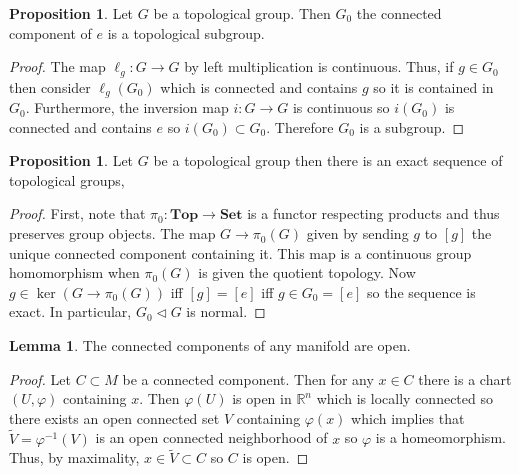 \documentclass[12pt]{extarticle}
\newcommand{\R}{\mathbb{R}}
\theoremstyle{definition}
\newtheorem{lemma}[theorem]{Lemma}
\newtheorem{proposition}[theorem]{Proposition}
\begin{document}
\begin{proposition}
Let $G$ be a topological group. Then $G_0$ the connected component of $e$ is a topological subgroup. 
\end{proposition}

\begin{proof}
The map $\ell_g : G \to G$ by left multiplication is continuous. Thus, if $g \in G_0$ then consider $\ell_{g}(G_0)$ which is connected and contains $g$ so it is contained in $G_0$. Furthermore, the inversion map $i : G \to G$ is continuous so $i(G_0)$ is connected and contains $e$ so $i(G_0) \subset G_0$. Therefore $G_0$ is a subgroup. 
\end{proof}

\begin{proposition}
Let $G$ be a topological group then there is an exact sequence of topological groups,
\begin{center}
\end{center}
\end{proposition}

\begin{proof}
First, note that $\pi_0 : \mathbf{Top} \to \mathbf{Set}$ is a functor respecting products and thus preserves group objects. The map $G \to \pi_0(G)$ given by sending $g$ to $[g]$ the unique connected component containing it. This map is a continuous group homomorphism when $\pi_0(G)$ is given the quotient topology. 
Now $g \in \ker{(G \to \pi_0(G))}$ iff $[g] = [e]$ iff $g \in G_0 = [e]$ so the sequence is exact. In particular, $G_0 \triangleleft G$ is normal.
\end{proof}

\begin{lemma}
The connected components of any manifold are open. 
\end{lemma}

\begin{proof}
Let $C \subset M$ be a connected component. Then for any $x \in C$ there is a chart $(U, \varphi)$ containing $x$. Then $\varphi(U)$ is open in $\R^n$ which is locally connected so there exists an open connected set $V$ containing $\varphi(x)$ which implies that $\tilde{V} = \varphi^{-1}(V)$ is an open connected neighborhood of $x$ so $\varphi$ is a homeomorphism. Thus, by maximality, $x\in \tilde{V} \subset C$ so $C$ is open.
\end{proof}
\end{document}
